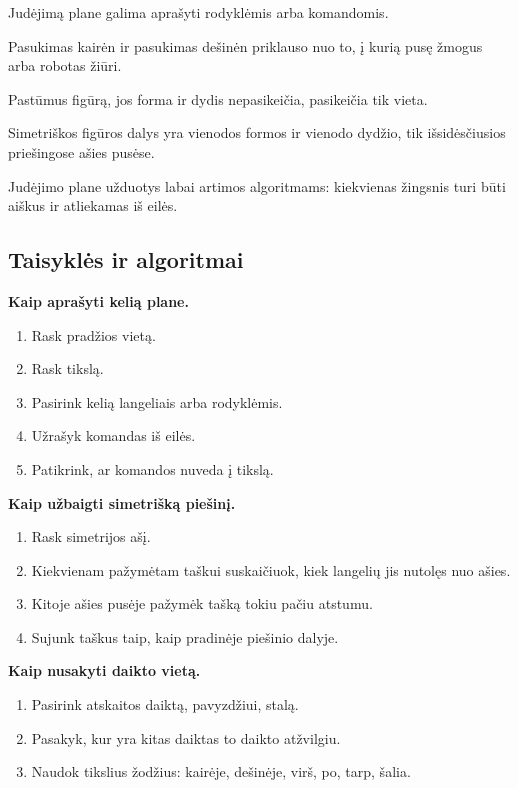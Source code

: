 \begin{savybe}
Judėjimą plane galima aprašyti rodyklėmis arba komandomis.
\end{savybe}

\begin{savybe}
Pasukimas kairėn ir pasukimas dešinėn priklauso nuo to, į kurią pusę žmogus arba robotas žiūri.
\end{savybe}

\begin{savybe}
Pastūmus figūrą, jos forma ir dydis nepasikeičia, pasikeičia tik vieta.
\end{savybe}

\begin{savybe}
Simetriškos figūros dalys yra vienodos formos ir vienodo dydžio, tik išsidėsčiusios priešingose ašies pusėse.
\end{savybe}

\begin{pastaba}
Judėjimo plane užduotys labai artimos algoritmams: kiekvienas žingsnis turi būti aiškus ir atliekamas iš eilės.
\end{pastaba}

\subsection{Taisyklės ir algoritmai}

\textbf{Kaip aprašyti kelią plane.}
\begin{enumerate}
\item Rask pradžios vietą.
\item Rask tikslą.
\item Pasirink kelią langeliais arba rodyklėmis.
\item Užrašyk komandas iš eilės.
\item Patikrink, ar komandos nuveda į tikslą.
\end{enumerate}

\textbf{Kaip užbaigti simetrišką piešinį.}
\begin{enumerate}
\item Rask simetrijos ašį.
\item Kiekvienam pažymėtam taškui suskaičiuok, kiek langelių jis nutolęs nuo ašies.
\item Kitoje ašies pusėje pažymėk tašką tokiu pačiu atstumu.
\item Sujunk taškus taip, kaip pradinėje piešinio dalyje.
\end{enumerate}

\textbf{Kaip nusakyti daikto vietą.}
\begin{enumerate}
\item Pasirink atskaitos daiktą, pavyzdžiui, stalą.
\item Pasakyk, kur yra kitas daiktas to daikto atžvilgiu.
\item Naudok tikslius žodžius: kairėje, dešinėje, virš, po, tarp, šalia.
\end{enumerate}

